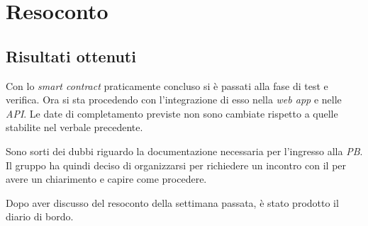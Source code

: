 \section{Resoconto}

\subsection{Risultati ottenuti}

Con lo \textit{smart contract} praticamente concluso si è passati alla fase di test e verifica. Ora si sta procedendo con l'integrazione di esso nella \textit{web app} e nelle \textit{API}. Le date di completamento previste non sono cambiate rispetto a quelle stabilite nel verbale precedente.

Sono sorti dei dubbi riguardo la documentazione necessaria per l'ingresso alla \textit{PB}. Il gruppo ha quindi deciso di organizzarsi per richiedere un incontro con il \Cardin{} per avere un chiarimento e capire come procedere.

Dopo aver discusso del resoconto della settimana passata, è stato prodotto il diario di bordo.